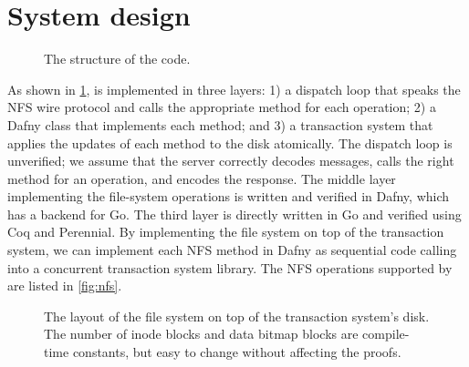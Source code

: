 \section{System design}%
\label{sec:system}


\begin{figure}
  \center
  
  \caption{The structure of the code.}
  \label{fig:system}
\end{figure}

As shown in \cref{fig:system}, \sys is implemented in three layers:
1) a dispatch loop that speaks the NFS wire protocol and calls the
appropriate method for each operation; 2) a Dafny class that
implements each method; and 3) a transaction system that applies the
updates of each method to the disk atomically.  The dispatch loop is
unverified; we assume that the server correctly decodes messages,
calls the right method for an operation, and encodes the response. The
middle layer implementing the file-system operations is written
and verified in Dafny, which has a backend for Go.  The
third layer is directly written in Go and verified using Coq and
Perennial.  By implementing the file system on top of the transaction
system, we can implement each NFS method in Dafny as sequential code
calling into a concurrent transaction system library. The NFS
operations supported by \sys are listed in \cref{fig:nfs}.


\begin{figure}
  
  \vspace{-1.75em}
  \caption{The layout of the file system on top of the transaction system's
    disk. The number of inode blocks and data bitmap blocks are compile-time
    constants, but easy to change without affecting the proofs.}
  \label{fig:layout}
\end{figure}

